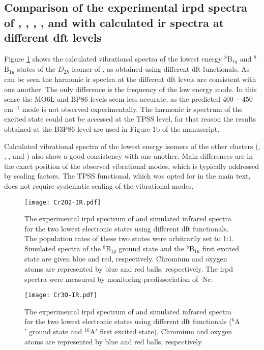 \begin{refsection}
\clearpage
\section[Simulated versus Experimental Spectra]{Comparison of the experimental \acrshort{irpd} spectra of , , , , and  with calculated \acrshort{ir} spectra at different \acrshort{dft} levels}

Figure \ref{a7fig:Cr2O2-IR} shows the calculated vibrational spectra of the lowest energy $^8$B$_{1g}$ and $^8$B$_{1u}$ states of the $D_{2h}$ isomer of , as obtained using different \acrshort{dft} functionals. As can be seen the harmonic \acrshort{ir} spectra at the different \acrshort{dft} levels are consistent with one another. The only difference is the frequency of the low energy mode. In this sense the MO6L and BP86 levels seem less accurate, as the predicted $400 - 450$ cm$^{-1}$ mode is not observed experimentally. The harmonic \acrshort{ir} spectrum of the excited state  could not be accessed at the TPSS level, for that reason the results obtained at the B3P86 level are used in Figure 1b of the manuscript. 

Calculated vibrational spectra of the lowest energy isomers of the other clusters (, , , and ) also show a good consistency with one another. Main differences are in the exact position of the observed vibrational modes, which is typically addressed by scaling factors. The TPSS functional, which was opted for in the main text, does not require systematic scaling of the vibrational modes. 

\begin{figure}[]
	\centering
	\texttt{[image: Cr2O2-IR.pdf]}
	\caption{The experimental \acrshort{irpd}  spectrum of  and simulated infrared spectra for the two lowest electronic states using different \acrshort{dft} functionals. The population rates of these two states were arbitrarily set to 1:1. Simulated spectra of the $^8$B$_{1g}$ ground state and the $^8$B$_{1u}$ first excited state are given blue and red, respectively. Chromium and oxygen atoms are represented by blue and red balls, respectively. The \acrshort{irpd}  spectra were measured by monitoring predissociation of $\boldsymbol{\cdot}$Ne.}
	\label{a7fig:Cr2O2-IR}
\end{figure}

\begin{figure}[]
	\centering
	\texttt{[image: Cr3O-IR.pdf]}
	\caption{The experimental \acrshort{irpd}  spectrum of  and simulated infrared spectra for the two lowest electronic states using different \acrshort{dft} functionals ($^6$A$'$ ground state and $^{16}$A$'$ first excited state). Chromium and oxygen atoms are represented by blue and red balls, respectively.}
	\label{a7fig:Cr3O-IR}
\end{figure}


\end{refsection}
